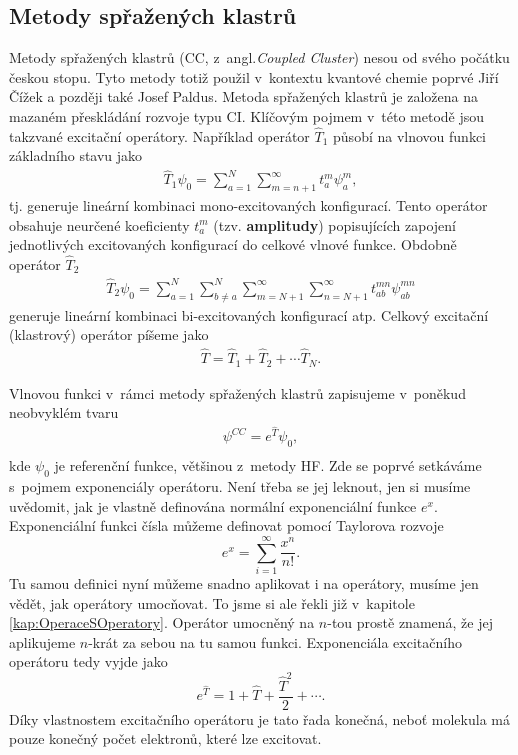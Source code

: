 \subsection{Metody spřažených klastrů}
Metody spřažených klastrů (CC, z~angl.\textit{Coupled Cluster}) nesou od svého počátku českou stopu. Tyto metody totiž použil v~kontextu kvantové chemie poprvé Jiří Čížek a později také Josef Paldus. Metoda spřažených klastrů je založena na mazaném přeskládání rozvoje typu CI. Klíčovým pojmem v~této metodě jsou takzvané excitační operátory. Například operátor $\hat{T}_1$ působí na vlnovou funkci základního stavu jako
\begin{eqnarray}
\hat{T}_1\psi_0=\sum^N_{a=1}\sum_{m=n+1}^\infty t_a^m\psi_a^m , 
\end{eqnarray}
tj. generuje lineární kombinaci mono-excitovaných konfigurací.  Tento operátor obsahuje neurčené koeficienty $t_a^m$ (tzv. \textbf{amplitudy}) popisujících zapojení jednotlivých excitovaných konfigurací do celkové vlnové funkce. Obdobně operátor $\hat{T}_2$ 
\begin{eqnarray}
\hat{T}_2\psi_0=\sum_{a=1}^N \sum_{b\neq a}^N\sum_{m=N+1}^\infty \sum_{n=N+1}^\infty t_{ab}^{mn}\psi_{ab}^{mn}
\end{eqnarray}
generuje lineární kombinaci  bi-excitovaných konfigurací atp. Celkový excitační (klastrový) operátor píšeme jako
\begin{eqnarray}
\hat{T}=\hat{T}_1+\hat{T}_2+\cdots \hat{T}_N.
\end{eqnarray}

Vlnovou funkci v~rámci metody spřažených klastrů zapisujeme v~poněkud neobvyklém tvaru
\begin{eqnarray}
\psi^{CC} = e^{\hat{T}} \psi_0 ,  \\
\end{eqnarray}
kde $\psi_0$ je referenční funkce, většinou z~metody HF. Zde se poprvé setkáváme s~pojmem exponenciály operátoru. Není třeba se jej leknout, jen si musíme uvědomit, jak je vlastně definována normální exponenciální funkce $e^x$. Exponenciální funkci čísla můžeme definovat pomocí Taylorova rozvoje
\begin{equation}
e^x=\sum_{i=1}^\infty \frac{x^n}{n!} .
\end{equation}
Tu samou definici nyní můžeme snadno aplikovat i na operátory, musíme jen vědět, jak operátory umocňovat.
To jsme si ale řekli již v~kapitole \ref{kap:OperaceSOperatory}. Operátor umocněný na $n$-tou prostě znamená, že jej aplikujeme $n$-krát za sebou na tu samou funkci. Exponenciála excitačního operátoru tedy vyjde jako 
\begin{equation}
e^{\hat{T}} = 1+\hat{T}+\frac{\hat{T}^2}{2}+\cdots.
\end{equation}
Díky vlastnostem excitačního operátoru je tato řada konečná, neboť molekula má pouze konečný počet elektronů, které lze excitovat.

